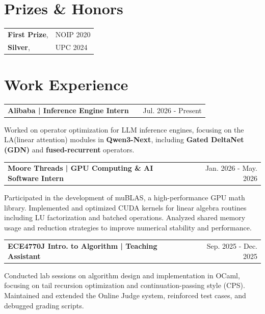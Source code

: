 \documentclass[a4paper,12pt]{article}
\makeatletter
\newenvironment{jobshort}[2]
    {
    \begin{tabularx}{\linewidth}{@{}l X r@{}}
    \textbf{#1} & \hfill &  #2 \\[3.75pt]
    \end{tabularx}
    }
    {
    }
\makeatother
\begin{document}

\section{Prizes \& Honors}
\begin{tabularx}{\linewidth}{@{}l X@{}}
\textbf{First Prize}, & NOIP 2020 \\
\textbf{Silver}, & UPC 2024
\end{tabularx}



\section{Work Experience}

\begin{jobshort}{Alibaba | Inference Engine Intern}{Jul. 2026 - Present}
Worked on operator optimization for LLM inference engines, focusing on the LA(linear attention) modules in \textbf{Qwen3-Next}, including \textbf{Gated DeltaNet (GDN)} and \textbf{fused-recurrent} operators.
\end{jobshort}

\begin{jobshort}{Moore Threads | GPU Computing \& AI Software Intern}{Jan. 2026 - May. 2026}
Participated in the development of muBLAS, a high-performance GPU math library. 
Implemented and optimized CUDA kernels for linear algebra routines including LU factorization and batched operations. 
Analyzed shared memory usage and reduction strategies to improve numerical stability and performance.
\end{jobshort}

\begin{jobshort}{ECE4770J Intro. to Algorithm | Teaching Assistant}{Sep. 2025 - Dec. 2025}
Conducted lab sessions on algorithm design and implementation in OCaml, focusing on tail recursion optimization and continuation-passing style (CPS). 
Maintained and extended the Online Judge system, reinforced test cases, and debugged grading scripts.
\end{jobshort}
\end{document}

